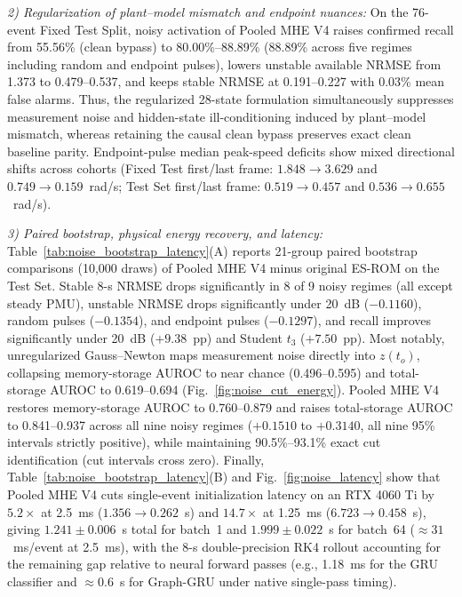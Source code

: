 \documentclass[journal]{IEEEtran}
\begin{document}
\emph{2) Regularization of plant--model mismatch and endpoint nuances:}
On the 76-event Fixed Test Split, noisy activation of Pooled MHE V4 raises
confirmed recall from 55.56\% (clean bypass) to 80.00\%--88.89\% (88.89\%
across five regimes including random and endpoint pulses), lowers unstable
available NRMSE from 1.373 to 0.479--0.537, and keeps stable NRMSE at
0.191--0.227 with 0.03\% mean false alarms. Thus, the regularized 28-state
formulation simultaneously suppresses measurement noise and hidden-state
ill-conditioning induced by plant--model mismatch, whereas retaining the
causal clean bypass preserves exact clean baseline parity. Endpoint-pulse
median peak-speed deficits show mixed directional shifts across cohorts
(Fixed Test first/last frame: \(1.848\to3.629\) and \(0.749\to0.159\)~rad/s;
Test Set first/last frame: \(0.519\to0.457\) and \(0.536\to0.655\)~rad/s).

\emph{3) Paired bootstrap, physical energy recovery, and latency:}
Table~\ref{tab:noise_bootstrap_latency}(A) reports 21-group paired bootstrap
comparisons (10,000 draws) of Pooled MHE V4 minus original ES-ROM on the Test
Set. Stable 8-s NRMSE drops significantly in 8 of 9 noisy regimes (all except
steady PMU), unstable NRMSE drops significantly under 20~dB (\(-0.1160\)),
random pulses (\(-0.1354\)), and endpoint pulses (\(-0.1297\)), and recall
improves significantly under 20~dB (\(+9.38\)~pp) and Student \(t_3\)
(\(+7.50\)~pp). Most notably, unregularized Gauss--Newton maps measurement
noise directly into \(z(t_o)\), collapsing memory-storage AUROC to near
chance (0.496--0.595) and total-storage AUROC to 0.619--0.694
(Fig.~\ref{fig:noise_cut_energy}). Pooled MHE V4 restores memory-storage
AUROC to 0.760--0.879 and raises total-storage AUROC to 0.841--0.937 across
all nine noisy regimes (\(+0.1510\) to \(+0.3140\), all nine 95\% intervals
strictly positive), while maintaining 90.5\%--93.1\% exact cut identification
(cut intervals cross zero). Finally, Table~\ref{tab:noise_bootstrap_latency}(B)
and Fig.~\ref{fig:noise_latency} show that Pooled MHE V4 cuts single-event
initialization latency on an RTX 4060 Ti by \(5.2\times\) at 2.5~ms
(\(1.356\to0.262\)~s) and \(14.7\times\) at 1.25~ms (\(6.723\to0.458\)~s),
giving \(1.241\pm0.006\)~s total for batch~1 and \(1.999\pm0.022\)~s for
batch~64 (\(\approx31\)~ms/event at 2.5~ms), with the 8-s double-precision
RK4 rollout accounting for the remaining gap relative to neural forward
passes (e.g., 1.18~ms for the GRU classifier and \(\approx0.6\)~s for
Graph-GRU under native single-pass timing).
\end{document}
